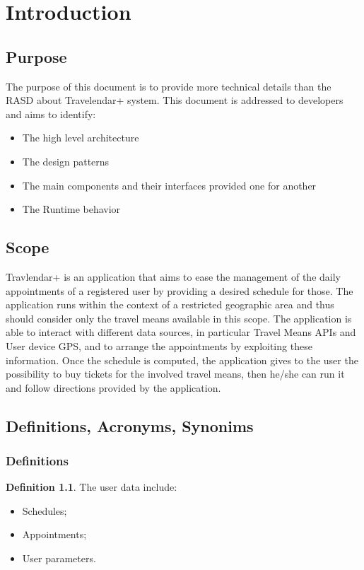 \chapter{Introduction}

\section{Purpose}
The purpose of this document is to provide more technical details than the RASD about Travelendar+ system. This document is addressed to developers and aims to identify:
\begin{itemize}
\item The high level architecture
\item The design patterns
\item The main components and their interfaces provided one for another
\item The Runtime behavior
\end{itemize}

\section{Scope}

Travlendar+ is an application that aims to ease the management of the daily appointments of a registered user by providing a desired schedule for those. 
The application runs within the context of a restricted geographic area and thus should consider only the travel means available in this scope.
The application is able to interact with different data sources, in particular Travel Means APIs and User device GPS, and to arrange the appointments by exploiting these information.
Once the schedule is computed, the application gives to the user the possibility to buy tickets for the involved travel means, then he/she can run it and follow directions provided by the application. 

\section{Definitions, Acronyms, Synonims}

\subsection{Definitions}
\theoremstyle{definition}
\newtheorem{definition}{Definition}[section]
 
\begin{definition} \label{def:userdata}
The user data include:
\begin{itemize}
\item Schedules;
\item Appointments;
\item User parameters.
\end{itemize}

\end{definition}
  

